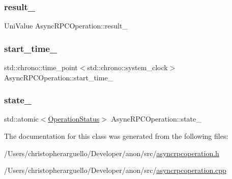 \subsubsection{\texorpdfstring{result\+\_\+}{result\_}}
{\footnotesize\ttfamily Uni\+Value Async\+R\+P\+C\+Operation\+::result\+\_\+\hspace{0.3cm}{\ttfamily [protected]}}

\mbox{\label{class_async_r_p_c_operation_a7ebcc576bfa71f5224b25c82d95a5790}} 
\subsubsection{\texorpdfstring{start\+\_\+time\+\_\+}{start\_time\_}}
{\footnotesize\ttfamily std\+::chrono\+::time\+\_\+point$<$std\+::chrono\+::system\+\_\+clock$>$ Async\+R\+P\+C\+Operation\+::start\+\_\+time\+\_\+\hspace{0.3cm}{\ttfamily [protected]}}

\mbox{\label{class_async_r_p_c_operation_a6f48909669cc4f503d448f14ed6f5da7}} 
\subsubsection{\texorpdfstring{state\+\_\+}{state\_}}
{\footnotesize\ttfamily std\+::atomic$<$\mbox{\hyperlink{asyncrpcoperation_8h_ac36eba6558c325a3ae9853d551326ff6}{Operation\+Status}}$>$ Async\+R\+P\+C\+Operation\+::state\+\_\+\hspace{0.3cm}{\ttfamily [protected]}}



The documentation for this class was generated from the following files\+:\begin{DoxyCompactItemize}
\item 
/\+Users/christopherarguello/\+Developer/anon/src/\mbox{\hyperlink{asyncrpcoperation_8h}{asyncrpcoperation.\+h}}\item 
/\+Users/christopherarguello/\+Developer/anon/src/\mbox{\hyperlink{asyncrpcoperation_8cpp}{asyncrpcoperation.\+cpp}}\end{DoxyCompactItemize}

